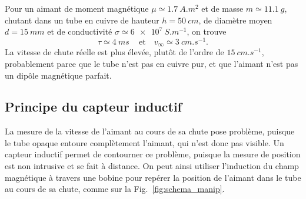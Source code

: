 \begin{quest}


{
  Pour un aimant de moment magnétique $\mu\simeq\SI{1.7}{A.m^2}$ et de masse $m\simeq\SI{11.1}{g}$, chutant dans un tube en cuivre de hauteur
  $h=\SI{50}{cm}$, de diamètre moyen $d=\SI{15}{mm}$ et de conductivité $\sigma \simeq \SI{6e7}{S.m^{-1}}$, on trouve
  \begin{equation*}
    \boxed{\tau \simeq \SI{4}{ms}}\, \quad \text{et} \quad  \boxed{v_{\infty} \simeq \SI{3}{cm.s^{-1}}}.
  \end{equation*}
  La vitesse de chute réelle est plus élevée, plutôt de l’ordre de $\SI{15}{cm.s^{-1}}$, probablement parce que le tube n’est pas en cuivre pur, et que l’aimant n’est pas un dipôle magnétique parfait.
}
\end{quest}

\subsection{Principe du capteur inductif}
\label{sec:fluxmetre}

La mesure de la vitesse de l'aimant au cours de sa chute pose problème, puisque le tube opaque entoure complètement l'aimant, qui n'est donc pas visible. 
Un capteur inductif permet de contourner ce problème, puisque la mesure de position est non intrusive et se fait à distance. 
On peut ainsi utiliser l'induction du champ magnétique à travers une bobine pour repérer la position de l'aimant dans le tube au cours de sa chute, comme 
sur la Fig.~\ref{fig:schema_manip}. 


